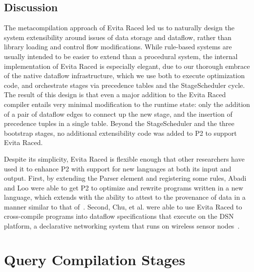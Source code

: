 \subsection{Discussion}

The metacompilation approach of Evita Raced led us to naturally design the
system extensibility around issues of data storage and dataflow, rather than
library loading and control flow modifications.  While rule-based systems are
usually intended to be easier to extend than a procedural system, the internal
implementation of Evita Raced is especially elegant, due to our thorough
embrace of the native dataflow infrastructure, which we use both to execute
optimization code, and orchestrate stages via precedence tables and the
StageScheduler cycle.  The result of this design is that even a major addition
to the Evita Raced compiler entails very minimal modification to the runtime
state: only the addition of a pair of dataflow edges to connect up the new
stage, and the insertion of precedence tuples in a single table.  Beyond the
StageScheduler and the three bootstrap stages, no additional extensibility code
was added to P2 to support Evita Raced.

Despite its simplicity, Evita Raced is flexible enough that other researchers
have used it to enhance P2 with support for new languages at both its input and
output.  First, by extending the Parser element and registering some \OVERLOG
rules, Abadi and Loo were able to get P2 to optimize and rewrite programs
written in a new language, which extends \OVERLOG with the ability to attest to
the provenance of data in a manner similar to that of~\cite{abadi-netdb07}.
Second, Chu, et al. were able to use Evita Raced to cross-compile \OVERLOG programs
into dataflow specifications that execute on the DSN platform, a declarative
networking system that runs on wireless sensor nodes~\cite{chu-sensys07}.


\section{Query Compilation Stages}
\label{ch:evita:sec:stages}

